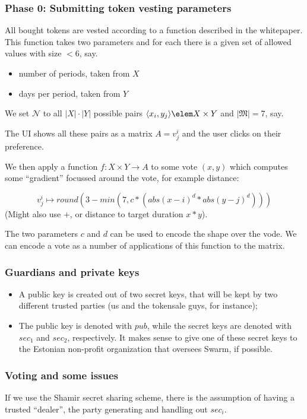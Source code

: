 \documentclass[submission, copyright,creativecommons,sharealike,noncommercial]{eptcs}
\begin{document}
		\subsubsection{Phase 0: Submitting token vesting parameters}
			All bought tokens are vested according to a function described in the
			whitepaper. This function takes two parameters and for each
			there is a given set of allowed values with size $< 6$, say.

			\begin{itemize}
			\item number of periods, taken from $X$
			\item days per period, taken from $Y$
			\end{itemize}


			We set $\mathcal{N}$ to all $|X|\cdot|Y|$ possible pairs
			$\langle x_i, y_j \rangle \elem X \times Y$ and
			$|\mathfrak{M}|=7$, say.

			The UI shows all these pairs as a matrix $A=v^i_j$
			and the user clicks on their preference.

			We then apply a function $f: X \times Y \to A$ to
			some vote $(x,y)$ which computes some ``gradient''
			focussed around the vote, for example distance:

			\[
			v^i_j \mapsto round(3 - min(7, c*(abs(x-i)^d * abs(y-j)^d)))
			\]
			(Might also use $+$, or distance to target duration $x*y$).

			The two parameters $c$ and $d$ can be used to encode the
			shape over the vode.  We can encode a vote as a number of
			applications of this function to the matrix.

		\subsubsection{Guardians and private keys}
			\begin{itemize}
				\item A public key is created out of two secret keys, that will be kept by two different trusted parties (us and the tokensale guys, for instance);
				
				\item The public key is denoted with $pub$, while the secret keys are denoted with $sec_1$ and $sec_2$, respectively. It makes sense to give one of these secret keys to the Estonian non-profit organization that oversees Swarm, if possible.
			\end{itemize}

		\subsubsection{Voting and some issues}
			If we use the Shamir secret sharing scheme, there is the
			assumption of having a trusted ``dealer'',
			the party generating and handling out $sec_i$.
\end{document}
